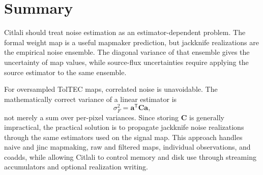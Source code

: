 \documentclass[11pt]{article}
\newcommand{\cov}{\boldsymbol{C}}
\newcommand{\mat}[1]{\boldsymbol{#1}}
\newcommand{\trans}{\mathsf{T}}
\begin{document}
\section{Summary}

Citlali should treat noise estimation as an estimator-dependent problem. The
formal weight map is a useful mapmaker prediction, but jackknife realizations
are the empirical noise ensemble. The diagonal variance of that ensemble gives
the uncertainty of map values, while source-flux uncertainties require applying
the source estimator to the same ensemble.

For oversampled TolTEC maps, correlated noise is unavoidable. The mathematically
correct variance of a linear estimator is
\[
  \sigma_F^2 = \mat{a}^\trans \cov \mat{a},
\]
not merely a sum over per-pixel variances. Since storing \(\cov\) is generally
impractical, the practical solution is to propagate jackknife noise
realizations through the same estimators used on the signal map. This approach
handles naive and jinc mapmaking, raw and filtered maps, individual
observations, and coadds, while allowing Citlali to control memory and disk use
through streaming accumulators and optional realization writing.
\end{document}
